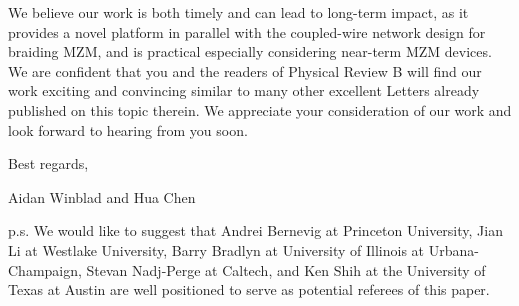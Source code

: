 \documentclass[11pt,letterpaper,roman]{moderncv}        %
\begin{document}
We believe our work is both timely and can lead to long-term impact, as it provides a novel platform in parallel with the coupled-wire network design for braiding MZM, and is practical especially considering near-term MZM devices. We are confident that you and the readers of Physical Review B will find our work exciting and convincing similar to many other excellent Letters already published on this topic therein. We appreciate your consideration of our work and look forward to hearing from you soon.

Best regards,

Aidan Winblad and Hua Chen

p.s. We would like to suggest that Andrei Bernevig at Princeton University, Jian Li at Westlake University, Barry Bradlyn at University of Illinois at Urbana-Champaign, Stevan Nadj-Perge at Caltech, and Ken Shih at the University of Texas at Austin are well positioned to serve as potential referees of this paper. 



\end{document}
